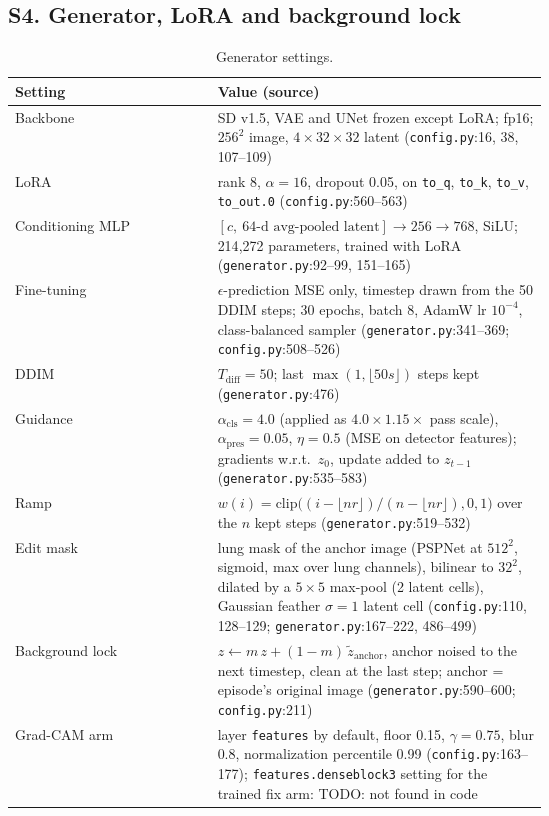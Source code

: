 \subsection*{S4. Generator, LoRA and background lock}

\begin{table}[t]
\centering
\small
\begin{tabular}{@{}lp{0.62\linewidth}@{}}
\toprule
Setting & Value (source) \\
\midrule
Backbone & SD v1.5, VAE and UNet frozen except LoRA; fp16; $256^2$ image, $4 \times 32 \times 32$ latent (\texttt{config.py}:16, 38, 107--109) \\
LoRA & rank 8, $\alpha = 16$, dropout 0.05, on \texttt{to\_q}, \texttt{to\_k}, \texttt{to\_v}, \texttt{to\_out.0} (\texttt{config.py}:560--563) \\
Conditioning MLP & $[c,\ \text{64-d avg-pooled latent}] \to 256 \to 768$, SiLU; 214{,}272 parameters, trained with LoRA (\texttt{generator.py}:92--99, 151--165) \\
Fine-tuning & $\epsilon$-prediction MSE only, timestep drawn from the 50 DDIM steps; 30 epochs, batch 8, AdamW lr $10^{-4}$, class-balanced sampler (\texttt{generator.py}:341--369; \texttt{config.py}:508--526) \\
DDIM & $T_{\text{diff}} = 50$; last $\max(1, \lfloor 50 s \rfloor)$ steps kept (\texttt{generator.py}:476) \\
Guidance & $\alpha_{\text{cls}} = 4.0$ (applied as $4.0 \times 1.15 \times$ pass scale), $\alpha_{\text{pres}} = 0.05$, $\eta = 0.5$ (MSE on detector features); gradients w.r.t.\ $\hat z_0$, update added to $z_{t-1}$ (\texttt{generator.py}:535--583) \\
Ramp & $w(i) = \mathrm{clip}\big((i - \lfloor n r \rfloor)/(n - \lfloor n r \rfloor), 0, 1\big)$ over the $n$ kept steps (\texttt{generator.py}:519--532) \\
Edit mask & lung mask of the anchor image (PSPNet at $512^2$, sigmoid, max over lung channels), bilinear to $32^2$, dilated by a $5 \times 5$ max-pool (2 latent cells), Gaussian feather $\sigma = 1$ latent cell (\texttt{config.py}:110, 128--129; \texttt{generator.py}:167--222, 486--499) \\
Background lock & $z \leftarrow m\,z + (1 - m)\,\tilde z_{\text{anchor}}$, anchor noised to the next timestep, clean at the last step; anchor = episode's original image (\texttt{generator.py}:590--600; \texttt{config.py}:211) \\
Grad-CAM arm & layer \texttt{features} by default, floor 0.15, $\gamma = 0.75$, blur 0.8, normalization percentile 0.99 (\texttt{config.py}:163--177); \texttt{features.denseblock3} setting for the trained fix arm: TODO: not found in code \\
\bottomrule
\end{tabular}
\caption{Generator settings.}
\end{table}

